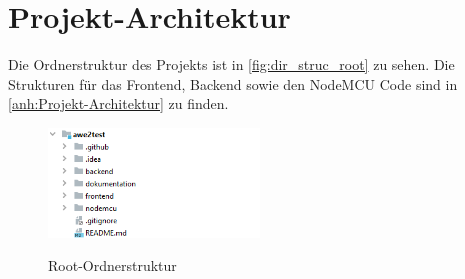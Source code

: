 \usepackage{hyperref}

\section{Projekt-Architektur}\label{Projekt-Architektur}
Die Ordnerstruktur des Projekts ist in \autoref{fig:dir_struc_root} zu sehen. Die Strukturen für das Frontend, Backend
sowie den NodeMCU Code sind in \autoref{anh:Projekt-Architektur} zu finden.
\begin{figure}[H]
    \centering
    \begin{minipage}[t]{1\textwidth}
        \caption{Root-Ordnerstruktur}
        \includegraphics[width=0.5\textwidth]{img/dir_struc_root.png}\\
        \label{fig:dir_struc_root}
    \end{minipage}
\end{figure}





